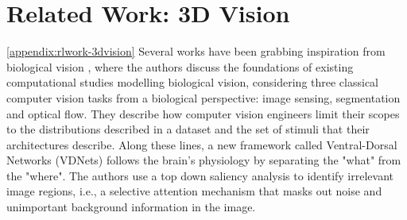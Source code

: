 \section{Related Work: 3D Vision}\ref{appendix:rlwork-3dvision}
Several works have been grabbing inspiration from biological vision \cite{medathati2016bio}, where the authors discuss the foundations of existing computational studies modelling biological vision, considering three classical computer vision tasks from a biological perspective: image sensing, segmentation and optical flow. They describe how computer vision engineers limit their scopes to the distributions described in a dataset and the set of stimuli that their architectures describe.
%
Along these lines, a new framework called Ventral-Dorsal Networks (VDNets) \cite{ebrahimpour2019ventral} follows the brain's physiology by separating the "what" from the "where". The authors use a top down saliency analysis to identify irrelevant image regions, i.e., a selective attention mechanism that masks out noise and unimportant background information in the image. 
% 

